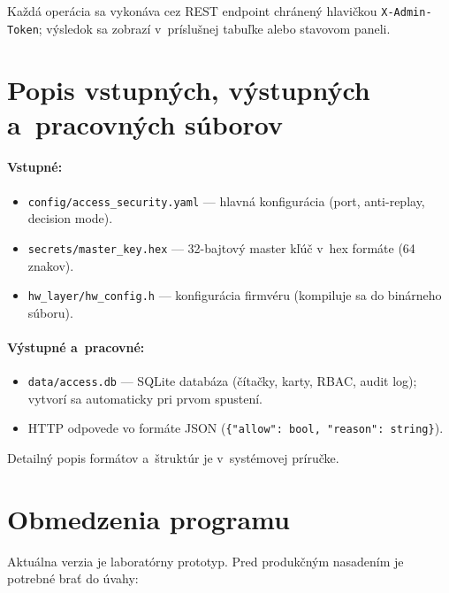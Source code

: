 \documentclass[a4paper]{feidippp}
\begin{document}
\noindent Každá operácia sa vykonáva cez REST endpoint chránený hlavičkou \texttt{X-Admin-Token}; výsledok sa zobrazí v~príslušnej tabuľke alebo stavovom paneli.

\section{Popis vstupných, výstupných a~pracovných súborov}

\paragraph{Vstupné:}
\begin{itemize}
\item \texttt{config/access\_security.yaml} --- hlavná konfigurácia (port, anti-replay, decision mode).
\item \texttt{secrets/master\_key.hex} --- 32-bajtový master kľúč v~hex formáte (64 znakov).
\item \texttt{hw\_layer/hw\_config.h} --- konfigurácia firmvéru (kompiluje sa do binárneho súboru).
\end{itemize}

\paragraph{Výstupné a~pracovné:}
\begin{itemize}
\item \texttt{data/access.db} --- SQLite databáza (čítačky, karty, RBAC, audit log); vytvorí sa automaticky pri prvom spustení.
\item HTTP odpovede vo formáte JSON (\texttt{\{"allow": bool, "reason": string\}}).
\end{itemize}

\noindent Detailný popis formátov a~štruktúr je v~systémovej príručke.

\section{Obmedzenia programu}

Aktuálna verzia je laboratórny prototyp. Pred produkčným nasadením je potrebné brať do úvahy:
\end{document}
